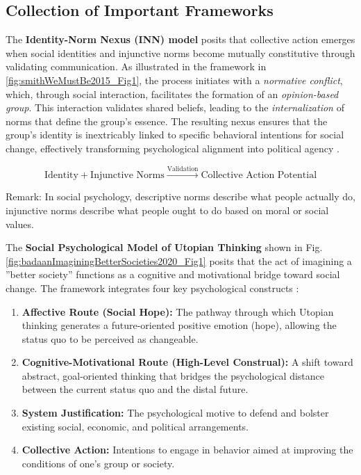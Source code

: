 \documentclass[jou,floatsintext]{apa7}
\begin{document}
\subsection{Collection of Important Frameworks}


The \textbf{Identity-Norm Nexus (INN) model} posits that collective action emerges when social identities and injunctive norms become mutually constitutive through validating communication. As illustrated in the framework in \ref{fig:smithWeMustBe2015_Fig1}, the process initiates with a \textit{normative conflict}, which, through social interaction, facilitates the formation of an \textit{opinion-based group}. This interaction validates shared beliefs, leading to the \textit{internalization} of norms that define the group's essence. The resulting nexus ensures that the group's identity is inextricably linked to specific behavioral intentions for social change, effectively transforming psychological alignment into political agency \parencite{smithWeMustBe2015}.

$$
\text{Identity} + \text{Injunctive Norms} \xrightarrow{\text{Validation}} \text{Collective Action Potential}
$$

Remark: In social psychology, descriptive norms describe what people actually do, injunctive norms describe what people ought to do based on moral or social values.


\vspace{0.1cm}
    \hrulefill
\vspace{0.1cm}

The \textbf{Social Psychological Model of Utopian Thinking} shown in Fig. \ref{fig:badaanImaginingBetterSocieties2020_Fig1} posits that the act of imagining a ''better society'' functions as a cognitive and motivational bridge toward social change. The framework integrates four key psychological constructs \parencite{badaanImaginingBetterSocieties2020}:

\begin{enumerate}
    \item \textbf{Affective Route (Social Hope):} The pathway through which Utopian thinking generates a future-oriented positive emotion (hope), allowing the status quo to be perceived as changeable.    
    \item \textbf{Cognitive-Motivational Route (High-Level Construal):} A shift toward abstract, goal-oriented thinking that bridges the psychological distance between the current status quo and the distal future.
    \item \textbf{System Justification:} The psychological motive to defend and bolster existing social, economic, and political arrangements.
    \item \textbf{Collective Action:} Intentions to engage in behavior aimed at improving the conditions of one's group or society.
\end{enumerate}
\end{document}
